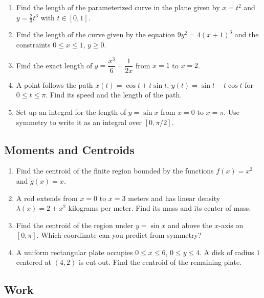 \documentclass{article}
\begin{document}
\begin{enumerate}
\item Find the length of the parameterized curve in the plane given by $x=t^2$ and $y=\frac{2}{3}t^3$ with $t\in[0,1]$.
\item Find the length of the curve given by the equation $9y^2=4(x+1)^3$ and the constraints $0 \leq x \leq 1$, $y \geq 0$.
\item Find the exact length of $y=\dfrac{x^3}{6}+\dfrac{1}{2x}$ from $x=1$ to $x=2$.
\item A point follows the path $x(t)=\cos t+t\sin t$, $y(t)=\sin t-t\cos t$ for $0\leq t\leq\pi$. Find its speed and the length of the path.
\item Set up an integral for the length of $y=\sin x$ from $x=0$ to $x=\pi$. Use symmetry to write it as an integral over $[0,\pi/2]$.
\end{enumerate}


\subsection{Moments and Centroids}

\begin{enumerate}
\item Find the centroid of the finite region bounded by the functions $f(x)=x^2$ and $g(x)=x$.
\item A rod extends from $x=0$ to $x=3$ meters and has linear density $\lambda(x)=2+x^2$ kilograms per meter. Find its mass and its center of mass.
\item Find the centroid of the region under $y=\sin x$ and above the $x$-axis on $[0,\pi]$. Which coordinate can you predict from symmetry?
\item A uniform rectangular plate occupies $0\leq x\leq 6$, $0\leq y\leq 4$. A disk of radius $1$ centered at $(4,2)$ is cut out. Find the centroid of the remaining plate.
\end{enumerate}


\subsection{Work}
\end{document}
